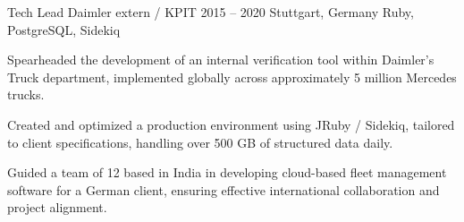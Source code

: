 \cvexperience
  {Tech Lead}
  {Daimler extern / KPIT}
  {2015 -- 2020}
  {Stuttgart, Germany}
  {Ruby, PostgreSQL, Sidekiq}
  {%
    \item Spearheaded the development of an internal verification tool within Daimler's Truck department, implemented globally across approximately 5 million Mercedes trucks.
    \item Created and optimized a production environment using JRuby / Sidekiq, tailored to client specifications, handling over 500 GB of structured data daily.
    \item Guided a team of 12 based in India in developing cloud-based fleet management software for a German client, ensuring effective international collaboration and project alignment.
  }
